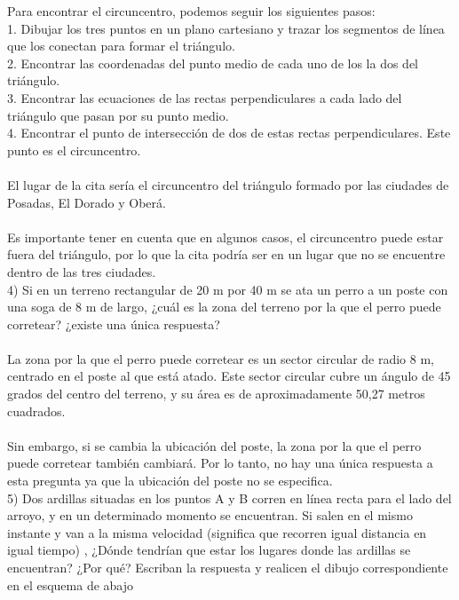 \documentclass{article}
\begin{document}
Para encontrar el circuncentro, podemos seguir los siguientes pasos:\\
1. Dibujar los tres puntos en un plano cartesiano y trazar los segmentos de línea que los conectan para formar el triángulo.\\
2. Encontrar las coordenadas del punto medio de cada uno de los la dos del triángulo.\\
3. Encontrar las ecuaciones de las rectas perpendiculares a cada lado del triángulo que pasan por su punto medio.\\
4. Encontrar el punto de intersección de dos de estas rectas perpendiculares. Este punto es el circuncentro.\\
\\
El lugar de la cita sería el circuncentro del triángulo formado por las ciudades de Posadas, El Dorado y Oberá.\\
\\
Es importante tener en cuenta que en algunos casos, el circuncentro puede estar fuera del triángulo, por lo que la cita podría ser en un lugar que no se encuentre dentro de las tres ciudades.\\



4) Si en un terreno rectangular de 20 m por 40 m se ata un perro a un poste con una soga de 8 m de largo, ¿cuál es la zona del terreno por la que el perro puede corretear? ¿existe una única respuesta? \\ \\
La zona por la que el perro puede corretear es un sector circular de radio 8 m, centrado en el poste al que está atado. Este sector circular cubre un ángulo de 45 grados del centro del terreno, y su área es de aproximadamente 50,27 metros cuadrados.\\
\\
Sin embargo, si se cambia la ubicación del poste, la zona por la que el perro puede corretear también cambiará. Por lo tanto, no hay una única respuesta a esta pregunta ya que la ubicación del poste no se especifica.\\

5) Dos ardillas situadas en los puntos A y B corren en línea recta para el lado del arroyo, y en un determinado momento se encuentran. Si salen en el mismo instante y van a la misma velocidad (significa que recorren igual distancia en igual tiempo) , ¿Dónde tendrían que estar los lugares donde las ardillas se encuentran? ¿Por qué? Escriban la respuesta y realicen el dibujo correspondiente en el esquema de abajo \\ \\
\end{document}
